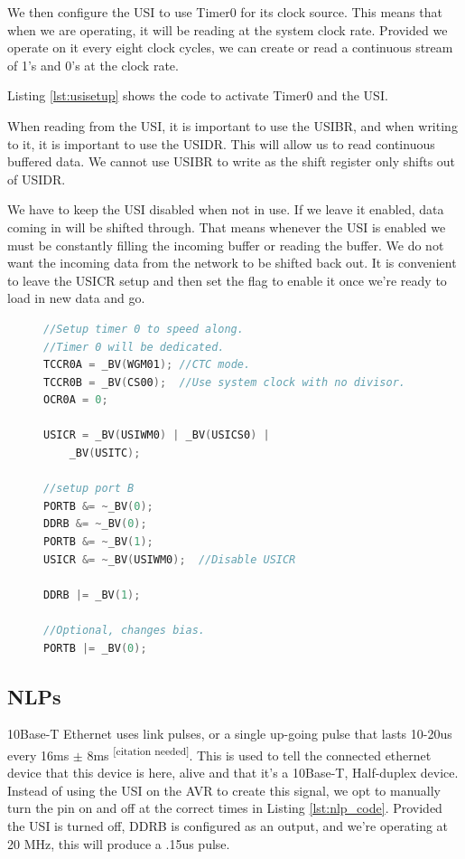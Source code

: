 \documentclass{article}
\begin{document}
We then configure the USI to use Timer0 for its clock source.  
This means that when we are operating, it will be
reading at the system clock rate.  Provided we operate on it every eight clock cycles, we can create or read
a continuous stream of 1's and 0's at the clock rate.

Listing \ref{lst:usisetup} shows the code to activate Timer0 and the USI.

When reading from the USI, it is important to use the USIBR, and when writing to it, it is important to use the USIDR.
This will allow us to read continuous buffered data.  We cannot use USIBR to write as the shift register only shifts out of
USIDR.

We have to keep the USI disabled when not in use.  If we leave it enabled, data coming in will be shifted through.  
That means whenever the USI is enabled we must be constantly filling the incoming buffer or reading the buffer.
We do 
not want the incoming data from the network to be shifted back out.  It is convenient to leave the USICR setup and then
set the flag to enable it once we're ready to load in new data and go.


\begin{figure}
\begin{lstlisting}[caption=USI Setup\label{lst:usisetup},language=C, frame=single]
//Setup timer 0 to speed along.
//Timer 0 will be dedicated.
TCCR0A = _BV(WGM01); //CTC mode.
TCCR0B = _BV(CS00);  //Use system clock with no divisor.
OCR0A = 0;

USICR = _BV(USIWM0) | _BV(USICS0) |
	_BV(USITC);

//setup port B
PORTB &= ~_BV(0); 
DDRB &= ~_BV(0);
PORTB &= ~_BV(1);
USICR &= ~_BV(USIWM0);  //Disable USICR

DDRB |= _BV(1);

//Optional, changes bias.
PORTB |= _BV(0);
\end{lstlisting}
\end{figure}


\subsection{NLPs}
10Base-T Ethernet uses link pulses, or a single up-going pulse that lasts 10-20us
every 16ms $\pm$ 8ms \textsuperscript{[citation needed]}.  This is used to tell
the connected ethernet device that this device is here, alive and that it's a
10Base-T, Half-duplex device.  Instead of using the USI on the AVR to create this
signal, we opt to manually turn the pin on and off at the correct times in
Listing \ref{lst:nlp_code}.  Provided the USI is turned off, DDRB is configured as
an output, and we're operating at 20 MHz, this will produce a .15us pulse.
\end{document}
